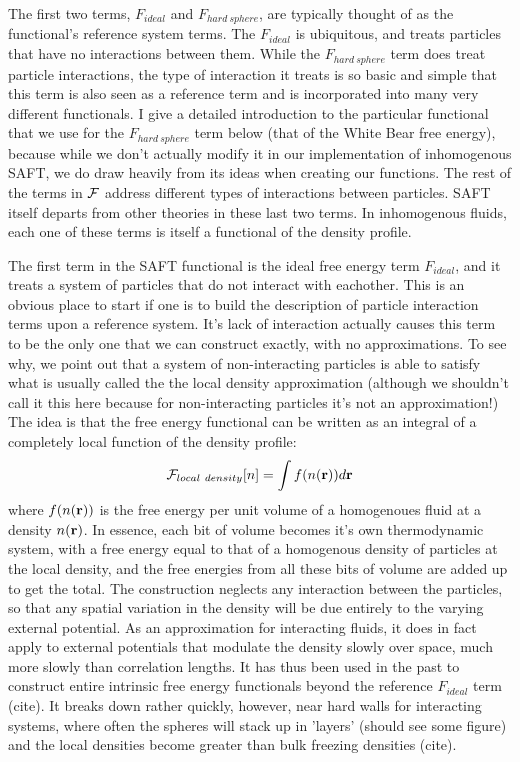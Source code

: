The first two terms, $F_{ideal}$ and $F_{hard~sphere}$, are typically
thought of as the functional's reference system terms.  The
$F_{ideal}$ is ubiquitous, and treats particles that have no
interactions between them.  While the $F_{hard~sphere}$ term does
treat particle interactions, the type of interaction it treats is so
basic and simple that this term is also seen as a reference term and
is incorporated into many very different functionals.  I give a
detailed introduction to the particular functional that we use for the
$F_{hard~sphere}$ term below (that of the White Bear free energy),
because while we don't actually modify it in our implementation of
inhomogenous SAFT, we do draw heavily from its ideas when creating our
functions.  The rest of the terms in $\mathcal{F}$ address different types of
interactions between particles.  SAFT itself departs from other
theories in these last two terms.  In inhomogenous fluids, each one of
these terms is itself a functional of the density profile.


The first term in the SAFT functional is the ideal free energy term
$F_{ideal}$, and it treats a system of particles that do not interact
with eachother.  This is an obvious place to start if one is to build
the description of particle interaction terms upon a reference system.
It's lack of interaction actually causes this term to be the only one
that we can construct exactly, with no approximations.  To see why, we
point out that a system of non-interacting particles is able to
satisfy what is usually called the the local density approximation
(although we shouldn't call it this here because for non-interacting
particles it's not an approximation!)  The idea is that the free
energy functional can be written as an integral of a completely local
function of the density profile:
\begin{align}
  \mathcal{F}_{local~density}[n] = \int f(n(\textbf{r})) d\textbf{r}
\end{align}
where $f(n(\textbf{r}))$ is the free energy per unit volume of a homogenoues
fluid at a density $n(\textbf{r})$.  In essence, each bit of volume becomes
it's own thermodynamic system, with a free energy equal to that of a
homogenous density of particles at the local density, and the free
energies from all these bits of volume are added up to get the total.
The construction neglects any interaction between the particles, so
that any spatial variation in the density will be due entirely to the
varying external potential.  As an approximation for interacting
fluids, it does in fact apply to external potentials that modulate the
density slowly over space, much more slowly than correlation lengths.
It has thus been used in the past to construct entire intrinsic free
energy functionals beyond the reference $F_{ideal}$ term (cite).  It
breaks down rather quickly, however, near hard walls for interacting
systems, where often the spheres will stack up in 'layers' (should see
some figure) and the local densities become greater than bulk freezing
densities (cite).

